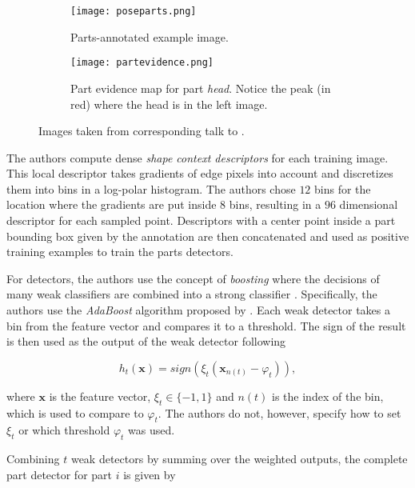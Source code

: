 \begin{figure}
    \centering
    \begin{subfigure}[b]{0.45\textwidth}
        \centering
        \texttt{[image: poseparts.png]}
        \caption{Parts-annotated example image.}
        \vspace{25px}
        \label{fig:parts-annot}
    \end{subfigure}
    \begin{subfigure}[b]{0.45\textwidth}
        \centering
        \texttt{[image: partevidence.png]}
        \caption{Part evidence map for part \textit{head}. Notice the peak (in red) where the head is in the left image.}
        \label{fig:parts-evidence}
    \end{subfigure}
    \caption{Images taken from corresponding talk to \cite{andriluka_pictorial_2009}.}
\end{figure}

The authors compute dense \textit{shape context descriptors} \cite{belongie_shape_2002} for each training image.
This local descriptor takes gradients of edge pixels into account and discretizes them into bins in a log-polar histogram.
The authors chose $12$ bins for the location where the gradients are put inside $8$ bins, resulting in a $96$ dimensional descriptor for each sampled point.
Descriptors with a center point inside a part bounding box given by the annotation are then concatenated and used as positive training examples to train the parts detectors.

For detectors, the authors use the concept of \textit{boosting} where the decisions of many weak classifiers are combined into a strong classifier \cite{freund_short_1999}.
Specifically, the authors use the \textit{AdaBoost} algorithm proposed by \cite{freund_decision-theoretic_1997}.
Each weak detector takes a bin from the feature vector and compares it to a threshold.
The sign of the result is then used as the output of the weak detector following

\begin{equation}
    h_t(\bm{x}) = sign(\xi_t (\bm{x}_{n(t)} - \varphi_t )),
\end{equation}

where $\bm{x}$ is the feature vector, $\xi_t \in \{-1, 1\}$ and $n(t)$ is the index of the bin, which is used to compare to $\varphi_t$.
The authors do not, however, specify how to set $\xi_t$ or which threshold $\varphi_t$ was used.

Combining $t$ weak detectors by summing over the weighted outputs, the complete part detector for part $i$ is given by 

